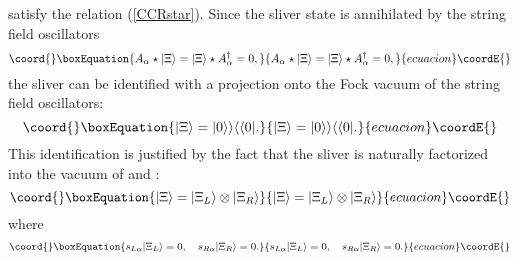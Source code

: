 \documentclass[a4paper,12pt]{article}
\def\ket{\rangle}
\def\al{\alpha}
\def\tens{\otimes}
\def\dag{\dagger}
\def\st{\star}
\providecommand{\kket}{\rangle\rangle}
\providecommand{\bbra}{\langle\langle}
\begin{document}
satisfy the relation (\ref{CCRstar}).
Since the sliver state is annihilated by the string field oscillators
\begin{equation}\coord{}\boxEquation{
 A_{\al}\st|\Xi\ket=|\Xi\ket\st A^{\dag}_{\al}=0,
}{
 A_{\al}\st|\Xi\ket=|\Xi\ket\st A^{\dag}_{\al}=0,
}{ecuacion}\coordE{}\end{equation}
the sliver can be identified with a projection onto the Fock vacuum 
\myHighlight{$|0\kket$}\coordHE{} of the string field oscillators:
\begin{equation}\coord{}\boxEquation{
 |\Xi\ket=|0\kket\bbra 0|.
}{
 |\Xi\ket=|0\kket\bbra 0|.
}{ecuacion}\coordE{}\end{equation}
This identification is justified by the fact that the sliver
is naturally factorized into the vacuum of \coordHE{} and \coordHE{}: 
\begin{equation}\coord{}\boxEquation{
 |\Xi\ket=|\Xi_L\ket\tens|\Xi_R\ket
}{
 |\Xi\ket=|\Xi_L\ket\tens|\Xi_R\ket
}{ecuacion}\coordE{}\end{equation}
where
\begin{equation}\coord{}\boxEquation{
 s_{L\al}|\Xi_L\ket=0, \quad s_{R\al}|\Xi_R\ket=0.
}{
 s_{L\al}|\Xi_L\ket=0, \quad s_{R\al}|\Xi_R\ket=0.
}{ecuacion}\coordE{}\end{equation}
\end{document}
